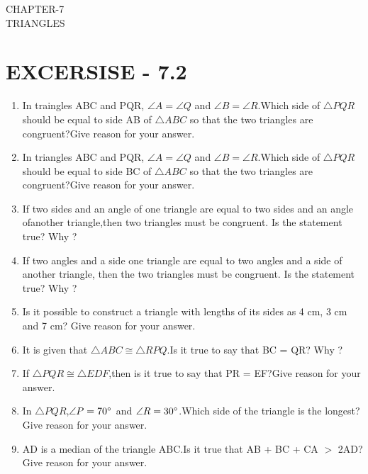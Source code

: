 \documentclass[12pt]{article}
\begin{document}
\begin{center}
\textbf\large{CHAPTER-7  \\  TRIANGLES}
\section*{EXCERSISE - 7.2}
\end{center}

\begin{enumerate}

\item In traingles ABC and PQR, $ \angle{A} = \angle{Q} $ and $ \angle{B} = \angle{R} $.Which side of $ \triangle{PQR} $ should be equal to side AB of $ \triangle{ABC} $ so that the two triangles are congruent?Give reason for your answer.

\item In triangles ABC and PQR, $ \angle{A} = \angle{Q} $ and $ \angle{B} = \angle{R} $.Which side of $ \triangle{PQR} $should be equal to side BC of $ \triangle{ABC} $ so that the two triangles are congruent?Give reason for your answer.

\item If two sides and an angle of one triangle are equal to two sides and an angle ofanother triangle,then two triangles must be congruent. Is the statement true? Why ?

\item If two angles and a side one triangle are equal to two angles and a side of another triangle, then the two triangles must be congruent. Is the statement true? Why ?

\item Is it possible to construct a triangle with lengths of its sides as 4 cm, 3 cm and 7 cm? Give reason for your answer.

\item It is given that $ \triangle{ABC} \cong \triangle{RPQ} $.Is it true to say that BC = QR? Why ?

\item If $ \triangle{PQR} \cong \triangle{EDF} $,then is it true to say that PR = EF?Give reason for your answer.

\item In $ \triangle{PQR} $,$ \angle{P} = 70\degree $ and $ \angle{R} = 30\degree $.Which side of the triangle is the longest?Give reason for your answer.

\item AD is a median of the triangle ABC.Is it true that AB + BC + CA $ > $ 2AD?Give reason for your answer.


\end{enumerate}
\end{document}
